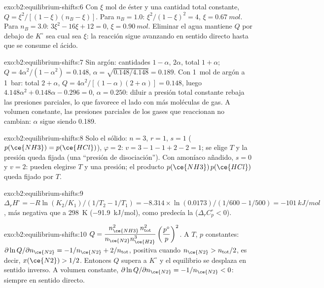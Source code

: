 \begin{solution}{exo:b2:equilibrium-shifts:6}
Con $\xi$ mol de éster y una cantidad total constante, $Q =
\xi^2/[(1 - \xi)(n_B - \xi)]$. Para $n_B = 1.0$: $\xi^2/(1 - \xi)^2 = 4$, $\xi
= \qty{0.67}{mol}$. Para $n_B = 3.0$: $3\xi^2 - 16\xi + 12 = 0$, $\xi =
\qty{0.90}{mol}$. Eliminar el agua mantiene $Q$ por debajo de $K^\circ$ sea cual sea $\xi$: la
reacción sigue avanzando en sentido directo hasta que se consume el ácido.
\end{solution}

\begin{solution}{exo:b2:equilibrium-shifts:7}
Sin argón: cantidades $1 - \alpha$, $2\alpha$, total $1 + \alpha$;
$Q = 4\alpha^2/(1 - \alpha^2) = 0.148$, $\alpha = \sqrt{0.148/4.148} = 0.189$.
Con \qty{1}{mol} de argón a \qty{1}{bar}: total $2 + \alpha$, $Q =
4\alpha^2/[(1 - \alpha)(2 + \alpha)] = 0.148$, luego $4.148\alpha^2 + 0.148\alpha
- 0.296 = 0$, $\alpha = 0.250$: diluir a presión total constante rebaja las
presiones parciales, lo que favorece el lado con más moléculas de gas. A
volumen constante, las presiones parciales de los gases que reaccionan no cambian:
$\alpha$ sigue siendo 0.189.
\end{solution}

\begin{solution}{exo:b2:equilibrium-shifts:8}
Solo el sólido: $n = 3$, $r = 1$, $s = 1$ ($p(\ce{NH3}) = p(\ce{HCl})$),
$\varphi = 2$: $v = 3 - 1 - 1 + 2 - 2 = 1$; se elige $T$ y la presión queda
fijada (una ``presión de disociación''). Con amoníaco añadido, $s = 0$ y $v = 2$:
pueden elegirse $T$ y una presión; el producto $p(\ce{NH3})\,p(\ce{HCl})$ queda
fijado por $T$.
\end{solution}

\begin{solution}{exo:b2:equilibrium-shifts:9}
$\Delta_r H^\circ = -R\ln(K_2/K_1)/(1/T_2 - 1/T_1) = -8.314 \times
\ln(0.0173)/(1/600 - 1/500) = \qty{-101}{kJ/mol}$, más negativa que a
\qty{298}{K} (\qty{-91.9}{kJ/mol}), como predecía la 
($\Delta_r C_p^\circ < 0$).
\end{solution}

\begin{solution}{exo:b2:equilibrium-shifts:10}
$Q = \dfrac{n_{\ce{NH3}}^2\,n_{\text{tot}}^2}{n_{\ce{N2}}n_{\ce{H2}}^3}
\left(\dfrac{p^\circ}{p}\right)^2$. A $T$, $p$ constantes:
$\partial\ln Q/\partial n_{\ce{N2}} = -1/n_{\ce{N2}} + 2/n_{\text{tot}}$, positiva
cuando $n_{\ce{N2}} > n_{\text{tot}}/2$, es decir, $x(\ce{N2}) > 1/2$. Entonces $Q$
supera a $K^\circ$ y el equilibrio se desplaza en sentido inverso. A volumen constante,
$\partial\ln Q/\partial n_{\ce{N2}} = -1/n_{\ce{N2}} < 0$: siempre en sentido directo.
\end{solution}

